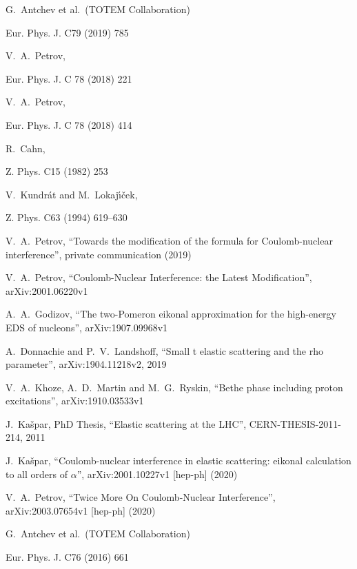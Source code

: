 \documentclass{appolb}
\begin{document}
\def\journal#1#2#3#4{
	#1 #2 (#3) #4
}

\begin{thebibliography}{9}

	G.~Antchev et al.~(TOTEM Collaboration)
	\journal{Eur. Phys. J.}{C79}{2019}{785}

	V.~A.~Petrov,
	\journal{Eur. Phys. J. C}{78}{2018}{221}

	V.~A.~Petrov,
	\journal{Eur. Phys. J. C}{78}{2018}{414}

	R.~Cahn,
	\journal{Z. Phys.}{C15}{1982}{253}

	V.~Kundr\'{a}t and M.~Lokaj\'{\i}\v{c}ek,
	\journal{Z. Phys.}{C63}{1994}{619--630}

	V.~A.~Petrov,
	``Towards the modification of the formula for Coulomb-nuclear interference'',
	private communication (2019)

	V.~A.~Petrov,
	``Coulomb-Nuclear Interference: the Latest Modification'',
	arXiv:2001.06220v1

	A.~A.~Godizov,
	``The two-Pomeron eikonal approximation for the high-energy EDS of nucleons'',
	arXiv:1907.09968v1

	A.~Donnachie and  P.~V.~Landshoff,
	``Small t elastic scattering and the rho parameter'',
	arXiv:1904.11218v2,
	2019

	V.~A.~Khoze, A.~D.~Martin and M.~G.~Ryskin,
	``Bethe phase including proton excitations'',
	arXiv:1910.03533v1
	
	J.~Ka\v{s}par,
	PhD Thesis,
	``Elastic scattering at the LHC'',
	CERN-THESIS-2011-214,
	2011

	J.~Ka\v{s}par,
	``Coulomb-nuclear interference in elastic scattering: eikonal calculation to all orders of $\alpha$'',
	arXiv:2001.10227v1 [hep-ph] (2020)

	V.~A.~Petrov,
	``Twice More On Coulomb-Nuclear Interference'',
	arXiv:2003.07654v1 [hep-ph] (2020)

	G.~Antchev et al.~(TOTEM Collaboration)
	\journal{Eur. Phys. J.}{C76}{2016}{661}


\end{thebibliography}
\end{document}

